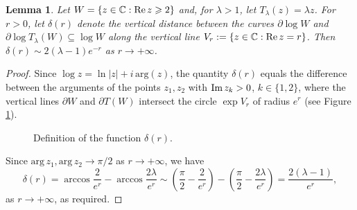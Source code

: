 \documentclass[a4paper, 12pt, reqno]{amsart}
\newcommand{\margin}[1]{\marginnote{\red{#1}}}
\numberwithin{equation}{section}
\newcommand{\red}[1]{{\color{red} #1}}
\theoremstyle{plain}
\newtheorem{lem}[thm]{Lemma}
\theoremstyle{definition}
\theoremstyle{remark}
\newcommand{\C}{{\mathbb{C}}}
\renewcommand{\Re}{\operatorname{Re}}
\renewcommand{\Im}{\operatorname{Im}}
\begin{document}
\begin{lem}
Let $W=\{z\in\C : \textup{Re}\, z\geqslant 2\}$ and, for $\lambda>1$, let \mbox{$T_\lambda(z)=\lambda z$}. For $r>0$, let $\delta (r)$ denote the vertical distance between the curves $\partial\log  W$ and $\partial\log T_\lambda(W)\subseteq \log W$ along the vertical line $V_r:=\{z\in\C : \textup{Re}\, z=r\}$. Then $\delta(r)\sim 2(\lambda-1)e^{-r}$ as $r\to+\infty$.
\label{lem:approx-BD}
\end{lem}
\begin{proof}
Since $\log z=\ln |z|+i\,\mbox{arg}(z)$, the quantity $\delta(r)$ equals the difference between the arguments of the points $z_1,z_2$ with $\textup{Im}\, z_k>0$, $k\in\{1,2\}$, where the vertical lines $\partial W$ and $\partial T(W)$ intersect the circle $\exp V_r$ of radius $e^r$ (see Figure \ref{fig:sketch-bd}).  %

\begin{figure}[h!]
\centering
\vspace{30pt}
\def\svgwidth{.8\linewidth}

\vspace{15pt}
\caption[Definition of the function $\delta(r)$]{Definition of the function $\delta(r)$.}
\label{fig:sketch-bd} 
\end{figure}


Since $\mbox{arg}\,z_1,\mbox{arg}\,z_2 \to\pi/2$ as $r\to+\infty$, we have
$$
\delta(r)=\arccos \frac{2}{e^r}-\arccos\frac{2\lambda}{e^r}\sim\left(\frac{\pi}{2}-\frac{2}{e^r}\right)-\left(\frac{\pi}{2}-\frac{2\lambda}{e^r}\right)=\frac{2(\lambda-1)}{e^r},
$$
as $r\to+\infty$, as required.
\end{proof}

\end{document}
